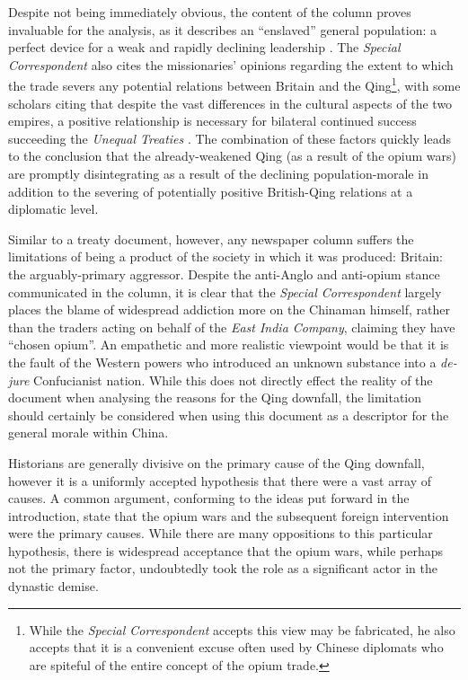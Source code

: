 \documentclass[a4paper,oneside]{article}
\begin{document}
        Despite not being immediately obvious, the content of the column proves invaluable for the analysis, as it describes an ``enslaved'' general population: a perfect device for a weak and rapidly declining leadership \autocite{Rotberg:2003}. The \textit{Special Correspondent} also cites the missionaries' opinions regarding the extent to which the trade severs any potential relations between Britain and the Qing\footnote{While the \textit{Special Correspondent} accepts this view may be fabricated, he also accepts that it is a convenient excuse often used by Chinese diplomats who are spiteful of the entire concept of the opium trade.}, with some scholars citing that despite the vast differences in the cultural aspects of the two empires, a positive relationship is necessary for bilateral continued success succeeding the \textit{Unequal Treaties} \autocite{Fairbank:1942}. The combination of these factors quickly leads to the conclusion that the already-weakened Qing (as a result of the opium wars) are promptly disintegrating as a result of the declining population-morale in addition to the severing of potentially positive British-Qing relations at a diplomatic level.

        Similar to a treaty document, however, any newspaper column suffers the limitations of being a product of the society in which it was produced: Britain: the arguably-primary aggressor. Despite the anti-Anglo and anti-opium stance communicated in the column, it is clear that the \textit{Special Correspondent} largely places the blame of widespread addiction more on the Chinaman himself, rather than the traders acting on behalf of the \textit{East India Company}, claiming they have ``chosen opium''. An empathetic and more realistic viewpoint would be that it is the fault of the Western powers who introduced an unknown substance into a \textit{de-jure} Confucianist \autocite{Billioud:2007} nation. While this does not directly effect the reality of the document when analysing the reasons for the Qing downfall, the limitation should certainly be considered when using this document as a descriptor for the general morale within China.

        Historians are generally divisive on the primary cause of the Qing downfall, however it is a uniformly accepted hypothesis that there were a vast array of causes. A common argument, conforming to the ideas put forward in the introduction, state that the opium wars and the subsequent foreign intervention were the primary causes. While there are many oppositions to this particular hypothesis, there is widespread acceptance that the opium wars, while perhaps not the primary factor, undoubtedly took the role as a significant actor in the dynastic demise.
\end{document}
